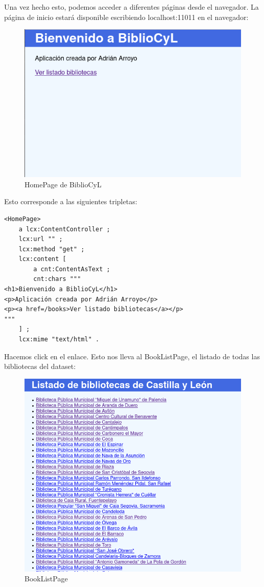 \documentclass[12pt]{report} %
\begin{document}
Una vez hecho esto, podemos acceder a diferentes páginas desde el navegador. La página de inicio estará disponible escribiendo localhost:11011 en el navegador:
\begin{figure}
    \centering
    \includegraphics[width=\textwidth]{tour/bibliocyl1.png}
    \caption{HomePage de BiblioCyL}
    \label{fig:bibliocyl1}
\end{figure}

Esto corresponde a las siguientes tripletas:
\begin{lstlisting}
<HomePage>
    a lcx:ContentController ;
    lcx:url "" ;
    lcx:method "get" ;
    lcx:content [
        a cnt:ContentAsText ;
        cnt:chars """
<h1>Bienvenido a BiblioCyL</h1>
<p>Aplicación creada por Adrián Arroyo</p>
<p><a href=/books>Ver listado bibliotecas</a></p>
"""
    ] ;
    lcx:mime "text/html" .
\end{lstlisting}

Hacemos click en el enlace. Esto nos lleva al BookListPage, el listado de todas las bibliotecas del dataset:

\begin{figure}
    \centering
    \includegraphics[width=\textwidth]{tour/bibliocyl2.png}
    \caption{BookListPage}
    \label{fig:bibliocyl2}
\end{figure}
\end{document}
